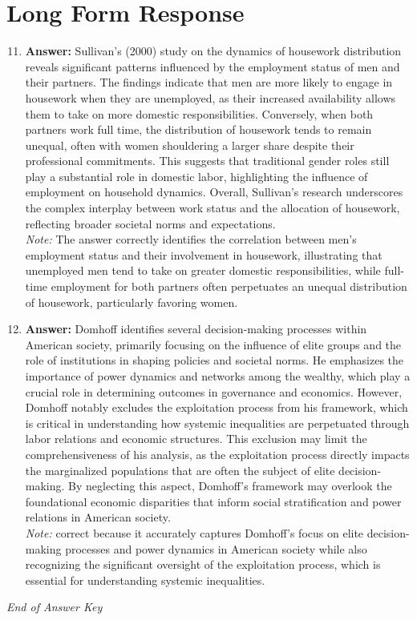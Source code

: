 \documentclass[12pt]{article}
\begin{document}
\section*{Long Form Response}
\begin{enumerate}[label=\arabic*.]
\setcounter{enumi}{10}
\item \textbf{Answer:} Sullivan's (2000) study on the dynamics of housework distribution reveals significant patterns influenced by the employment status of men and their partners. The findings indicate that men are more likely to engage in housework when they are unemployed, as their increased availability allows them to take on more domestic responsibilities. Conversely, when both partners work full time, the distribution of housework tends to remain unequal, often with women shouldering a larger share despite their professional commitments. This suggests that traditional gender roles still play a substantial role in domestic labor, highlighting the influence of employment on household dynamics. Overall, Sullivan's research underscores the complex interplay between work status and the allocation of housework, reflecting broader societal norms and expectations.
\\ \textit{Note:} The answer correctly identifies the correlation between men's employment status and their involvement in housework, illustrating that unemployed men tend to take on greater domestic responsibilities, while full-time employment for both partners often perpetuates an unequal distribution of housework, particularly favoring women.
\item \textbf{Answer:} Domhoff identifies several decision-making processes within American society, primarily focusing on the influence of elite groups and the role of institutions in shaping policies and societal norms. He emphasizes the importance of power dynamics and networks among the wealthy, which play a crucial role in determining outcomes in governance and economics. However, Domhoff notably excludes the exploitation process from his framework, which is critical in understanding how systemic inequalities are perpetuated through labor relations and economic structures. This exclusion may limit the comprehensiveness of his analysis, as the exploitation process directly impacts the marginalized populations that are often the subject of elite decision-making. By neglecting this aspect, Domhoff's framework may overlook the foundational economic disparities that inform social stratification and power relations in American society.
\\ \textit{Note:} correct because it accurately captures Domhoff's focus on elite decision-making processes and power dynamics in American society while also recognizing the significant oversight of the exploitation process, which is essential for understanding systemic inequalities.
\end{enumerate}

\vfill
\noindent\textit{End of Answer Key}
\end{document}
